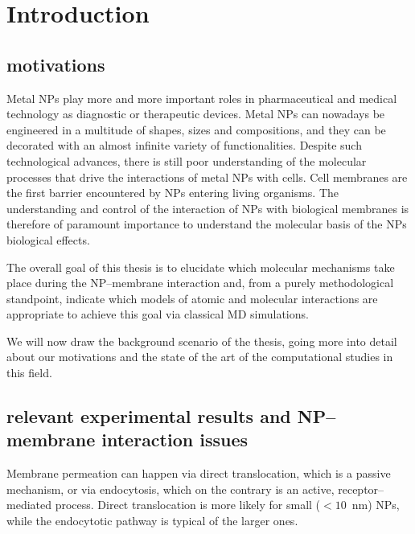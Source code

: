 \chapter{Introduction}
%
%
%

\begingroup
\toclesssection
\introductionStyle

\section{motivations}
Metal \acp{NP} play more and more important roles in pharmaceutical and medical technology as diagnostic or 
therapeutic devices. Metal \acp{NP} can nowadays be engineered in a multitude of shapes, sizes and compositions, 
and they can be decorated with an almost infinite variety of functionalities. Despite such technological advances, 
there is still poor understanding of the molecular processes that drive the interactions of metal \acp{NP} with 
cells. Cell membranes are the first barrier encountered by \acp{NP} entering living organisms. The understanding 
and control of the interaction of \acp{NP} with biological membranes is therefore of paramount importance to 
understand the molecular basis of the \acp{NP} biological effects.

The overall goal of this thesis is to elucidate which molecular mechanisms take place during the \ac{NP}--membrane 
interaction and, from a purely methodological standpoint, indicate which models of atomic and molecular 
interactions are appropriate to achieve this goal via classical \ac{MD} simulations.

We will now draw the background scenario of the thesis, going more into detail about our motivations and the state 
of the art of the computational studies in this field.

\section{relevant experimental results and NP--membrane interaction issues}
Membrane permeation can happen via direct translocation, which is a passive mechanism, or via endocytosis, which 
on the contrary is an active, receptor--mediated process. Direct translocation is more likely for small ($< 
10$~nm) \acp{NP}, while the endocytotic pathway is typical of the larger ones.

